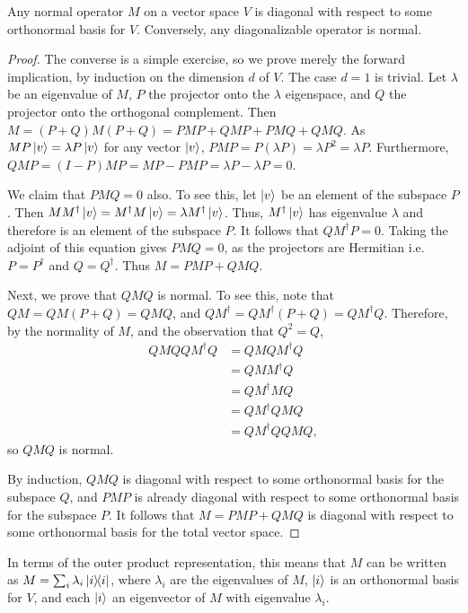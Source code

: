 \begin{theorem}
  Any normal operator $M$ on a vector space $V$ is diagonal with respect to
  some orthonormal basis for $V$. Conversely, any diagonalizable operator is
  normal.
\end{theorem}
\begin{proof}
  The converse is a simple exercise, so we prove merely the forward
  implication, by induction on the dimension $d$ of $V$. The case $d = 1$ is
  trivial. Let $\lambda$ be an eigenvalue of $M$, $P$ the projector onto the
  $\lambda$ eigenspace, and $Q$ the projector onto the orthogonal complement.
  Then $M = (P + Q)M(P + Q) = PMP + QMP + PMQ + QMQ$. As $MP\ket{v} = \lambda P
  \ket{v}$ for any vector $\ket{v}$, $PMP = P(\lambda P) = \lambda P^2 =
  \lambda P$. Furthermore, $QMP = (I - P)MP = MP - PMP = \lambda P - \lambda P
  = 0$.

  We claim that $PMQ = 0$ also. To see this, let $\ket{v}$ be an element of the
  subspace $P$. Then $M M^\dagger \ket{v} = M^\dagger M \ket{v} = \lambda
  M^\dagger \ket{v}$. Thus, $M^\dagger \ket{v}$ has eigenvalue $\lambda$ and
  therefore is an element of the subspace $P$. It follows that $Q M^\dagger P =
  0$. Taking the adjoint of this equation gives $PMQ = 0$, as the projectors
  are Hermitian i.e. $P = P^\dagger$ and $Q = Q^\dagger$. Thus $M = PMP + QMQ$.

  Next, we prove that $QMQ$ is normal. To see this, note that $QM = QM(P + Q) =
  QMQ$, and $Q M^\dagger = Q M^\dagger (P+Q) = Q M^\dagger Q$. Therefore, by
  the normality of $M$, and the observation that $Q^2 = Q$, \begin{align*}
    Q M Q Q M^\dagger Q
    &= Q M Q M^\dagger Q \\
    &= Q M M^\dagger Q \\
    &= Q M^\dagger M Q \\
    &= Q M^\dagger Q M Q \\
    &= Q M^\dagger Q Q M Q,
  \end{align*} so $QMQ$ is normal.

  By induction, $QMQ$ is diagonal with respect to some orthonormal basis for
  the subspace $Q$, and $PMP$ is already diagonal with respect to some
  orthonormal basis for the subspace $P$. It follows that $M = PMP + QMQ$ is
  diagonal with respect to some orthonormal basis for the total vector space.
\end{proof}

In terms of the outer product representation, this means that $M$ can be
written as $M = \sum_i \lambda_i \ketbra{i}{i}$, where $\lambda_i$ are the
eigenvalues of $M$, $\ket{i}$ is an orthonormal basis for $V$, and each
$\ket{i}$ an eigenvector of $M$ with eigenvalue $\lambda_i$.

